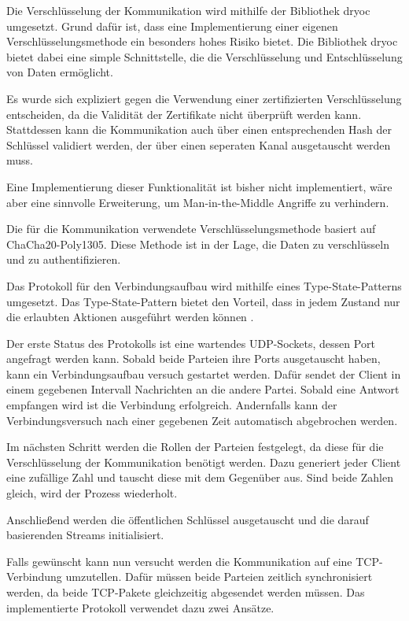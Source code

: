Die Verschlüsselung der Kommunikation wird mithilfe der Bibliothek dryoc umgesetzt. Grund dafür ist, dass eine Implementierung einer eigenen Verschlüsselungsmethode ein besonders hohes Risiko bietet. Die Bibliothek dryoc bietet dabei eine simple Schnittstelle, die die Verschlüsselung und Entschlüsselung von Daten ermöglicht.

Es wurde sich expliziert gegen die Verwendung einer zertifizierten Verschlüsselung entscheiden, da die Validität der Zertifikate nicht überprüft werden kann. Stattdessen kann die Kommunikation auch über einen entsprechenden Hash der Schlüssel validiert werden, der über einen seperaten Kanal ausgetauscht werden muss.

Eine Implementierung dieser Funktionalität ist bisher nicht implementiert, wäre aber eine sinnvolle Erweiterung, um Man-in-the-Middle Angriffe zu verhindern.

Die für die Kommunikation verwendete Verschlüsselungsmethode basiert auf ChaCha20-Poly1305. Diese Methode ist in der Lage, die Daten zu verschlüsseln und zu authentifizieren. \cite{google-2015}

Das Protokoll für den Verbindungsaufbau wird mithilfe eines Type-State-Patterns umgesetzt. Das Type-State-Pattern bietet den Vorteil, dass in jedem Zustand nur die erlaubten Aktionen ausgeführt werden können \cite{Apodaca-2023}.

Der erste Status des Protokolls ist eine wartendes UDP-Sockets, dessen Port angefragt werden kann. Sobald beide Parteien ihre Ports ausgetauscht haben, kann ein Verbindungsaufbau versuch gestartet werden. Dafür sendet der Client in einem gegebenen Intervall Nachrichten an die andere Partei. Sobald eine Antwort empfangen wird ist die Verbindung erfolgreich. Andernfalls kann der Verbindungsversuch nach einer gegebenen Zeit automatisch abgebrochen werden.

Im nächsten Schritt werden die Rollen der Parteien festgelegt, da diese für die Verschlüsselung der Kommunikation benötigt werden. Dazu generiert jeder Client eine zufällige Zahl und tauscht diese mit dem Gegenüber aus. Sind beide Zahlen gleich, wird der Prozess wiederholt.

Anschließend werden die öffentlichen Schlüssel ausgetauscht und die darauf basierenden Streams initialisiert.

Falls gewünscht kann nun versucht werden die Kommunikation auf eine TCP-Verbindung umzutellen. Dafür müssen beide Parteien zeitlich synchronisiert werden, da beide TCP-Pakete gleichzeitig abgesendet werden müssen. Das implementierte Protokoll verwendet dazu zwei Ansätze.

